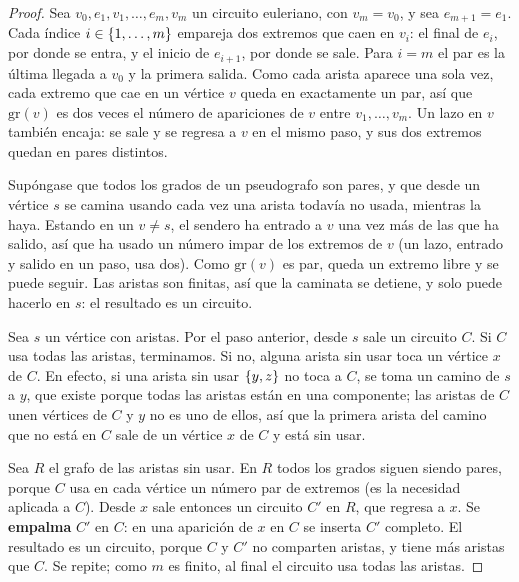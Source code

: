 \documentclass[11pt,letterpaper]{article}
\begin{document}
\begin{proof}
   Sea $v_0, e_1, v_1, \dots, e_m, v_m$ un circuito
  euleriano, con $v_m = v_0$, y sea $e_{m+1} = e_1$. Cada índice
  $i \in \left\{ 1, \dots, m \right\}$ empareja dos extremos que caen en $v_i$:
  el final de $e_i$, por donde se entra, y el inicio de $e_{i+1}$, por
  donde se sale. Para $i = m$ el par es la última llegada a $v_0$ y la
  primera salida. Como cada arista aparece una sola vez, cada extremo
  que cae en un vértice $v$ queda en exactamente un par, así que
  $\text{gr}(v)$ es dos veces el número de apariciones de $v$ entre
  $v_1, \dots, v_m$. Un lazo en $v$ también encaja: se sale y se
  regresa a $v$ en el mismo paso, y sus dos extremos quedan en pares
  distintos.

   Supóngase que todos los
  grados de un pseudografo son pares, y que desde un vértice $s$ se
  camina usando cada vez una arista todavía no usada, mientras la haya.
  Estando en un $v \neq s$, el sendero ha entrado a $v$ una vez más de
  las que ha salido, así que ha usado un número impar de los extremos
  de $v$ (un lazo, entrado y salido en un paso, usa dos). Como
  $\text{gr}(v)$ es par, queda un extremo libre y se puede seguir. Las
  aristas son finitas, así que la caminata se detiene, y solo puede
  hacerlo en $s$: el resultado es un circuito.

   Sea $s$ un vértice con aristas. Por el paso
  anterior, desde $s$ sale un circuito $C$. Si $C$ usa todas las
  aristas, terminamos. Si no, alguna arista sin usar toca un vértice
  $x$ de $C$. En efecto, si una arista sin usar $\left\{ y, z \right\}$ no toca a
  $C$, se toma un camino de $s$ a $y$, que existe porque todas las
  aristas están en una componente; las aristas de $C$ unen vértices de
  $C$ y $y$ no es uno de ellos, así que la primera arista del camino
  que no está en $C$ sale de un vértice $x$ de $C$ y está sin usar.

  Sea $R$ el grafo de las aristas sin usar. En $R$ todos los grados
  siguen siendo pares, porque $C$ usa en cada vértice un número par de
  extremos (es la necesidad aplicada a $C$). Desde $x$ sale entonces
  un circuito $C'$ en $R$, que regresa a $x$. Se \textbf{empalma}
  $C'$ en $C$: en una aparición de $x$ en $C$ se inserta $C'$
  completo. El resultado es un circuito, porque $C$ y $C'$ no
  comparten aristas, y tiene más aristas que $C$. Se repite; como $m$
  es finito, al final el circuito usa todas las aristas.
\end{proof}
\end{document}
